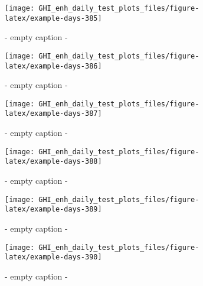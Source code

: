 \documentclass[
  10pt,
  a4paper,oneside]{article}
\begin{document}
\begin{figure}[H]

{\centering \texttt{[image: GHI\_enh\_daily\_test\_plots\_files/figure-latex/example-days-385]} 

}

\caption{ - empty caption - }\label{fig:example-days-385}
\end{figure}

\begin{figure}[H]

{\centering \texttt{[image: GHI\_enh\_daily\_test\_plots\_files/figure-latex/example-days-386]} 

}

\caption{ - empty caption - }\label{fig:example-days-386}
\end{figure}

\begin{figure}[H]

{\centering \texttt{[image: GHI\_enh\_daily\_test\_plots\_files/figure-latex/example-days-387]} 

}

\caption{ - empty caption - }\label{fig:example-days-387}
\end{figure}

\begin{figure}[H]

{\centering \texttt{[image: GHI\_enh\_daily\_test\_plots\_files/figure-latex/example-days-388]} 

}

\caption{ - empty caption - }\label{fig:example-days-388}
\end{figure}

\begin{figure}[H]

{\centering \texttt{[image: GHI\_enh\_daily\_test\_plots\_files/figure-latex/example-days-389]} 

}

\caption{ - empty caption - }\label{fig:example-days-389}
\end{figure}

\begin{figure}[H]

{\centering \texttt{[image: GHI\_enh\_daily\_test\_plots\_files/figure-latex/example-days-390]} 

}

\caption{ - empty caption - }\label{fig:example-days-390}
\end{figure}
\end{document}
